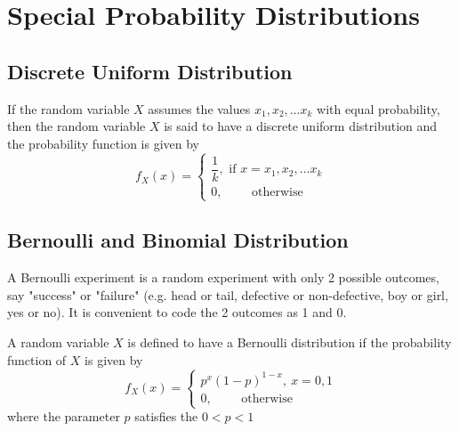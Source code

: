 \chapter{Special Probability Distributions}

\section{Discrete Uniform Distribution}

\begin{definition}
If the random variable $X$ assumes the values $x_1, x_2, \dots x_k$ with equal probability, then the random variable $X$ is said to have a discrete uniform distribution and the probability function is given by 
$$
f_X(x) = 
\begin{cases}
\dfrac{1}{k}, \text{ if } x = x_1, x_2, \dots x_k \\
0, \qquad \text{ otherwise}
\end{cases}
$$
\end{definition}
\section{Bernoulli and Binomial Distribution}

\begin{definition}
A Bernoulli experiment is a random experiment with only 2 possible outcomes, say "success" or "failure" (e.g. head or tail, defective or non-defective, boy or girl, yes or no). It is convenient to code the 2 outcomes as 1 and 0.
\end{definition}

\begin{definition}
A random variable $X$ is defined to have a Bernoulli distribution if the probability function of $X$ is given by 
$$
f_X(x) = \begin{cases}
p^x(1-p)^{1-x}, \  x = 0,1 \\
0, \qquad \text{ otherwise}
\end{cases}
$$ where the parameter $p$ satisfies the $0 < p < 1$
\end{definition}

